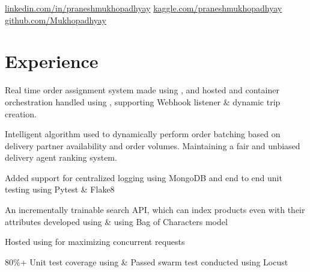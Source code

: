 \documentclass[]{deedy-resume-openfont}
\begin{document}
%
%
\lastupdated

%
%


\namesection{Pranesh}{Mukhopadhyay}{
\href{mailto:praneshmukherjee7@gmail.com}{praneshmukherjee7@gmail.com} | 96747-70912
}


\href{https://www.linkedin.com/in/praneshmukhopadhyay/}{ linkedin.com/in/praneshmukhopadhyay} \; \href{https://www.kaggle.com/praneshmukhopadhyay}{ kaggle.com/praneshmukhopadhyay} \; \href{https://github.com/Mukhopadhyay}{ github.com/Mukhopadhyay}



\section{Experience}

\vspace{\topsep} %

\begin{tightemize}
\item Real time order assignment system made using ,  and hosted and container orchestration handled using , supporting Webhook listener \& dynamic trip creation.
\item Intelligent algorithm used to dynamically perform order batching based on delivery partner availability and order volumes. Maintaining a fair and unbiased delivery agent ranking system.
\item Added support for centralized logging using MongoDB and end to end unit testing using Pytest \& Flake8
\end{tightemize}

\begin{tightemize}
\item An incrementally trainable search API, which can index products even with their attributes developed using  \&  using Bag of Characters model
\item Hosted using  for maximizing concurrent requests
\item 80\%+ Unit test coverage using \& Passed swarm test conducted using Locust
\end{tightemize}
\end{document}
